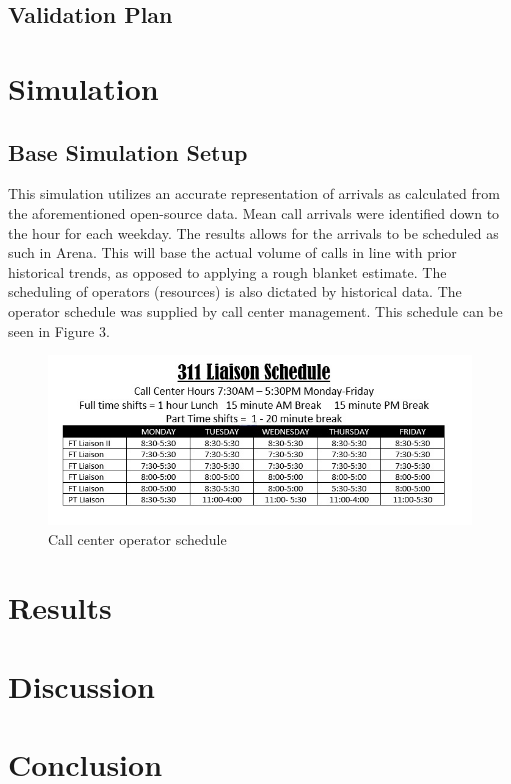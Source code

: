\documentclass[12pt,twocolumn]{article}
\begin{document}
	
	\subsection{Validation Plan}
	
	
\section{Simulation}

	\subsection{Base Simulation Setup}
This simulation utilizes an accurate representation of arrivals as calculated from the aforementioned open-source data.  Mean call arrivals were identified down to the hour for each weekday.  The results allows for the arrivals to be scheduled as such in Arena.  This will base the actual volume of calls in line with prior historical trends, as opposed to applying a rough blanket estimate.  The scheduling of operators (resources) is also dictated by historical data.  The operator schedule was supplied by call center management.  This schedule can be seen in Figure 3.  

	\begin{figure}[h]
	\includegraphics[scale=.35]{schedule2.jpg}
	\caption{Call center operator schedule}
	\end{figure}

\section{Results}

\section{Discussion}


\section{Conclusion}
\end{document}
